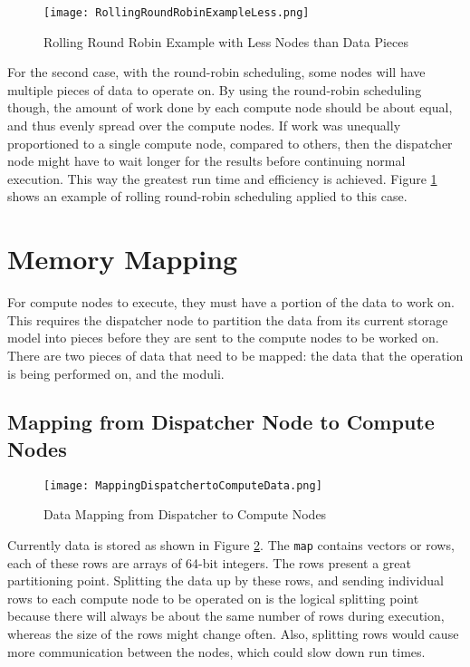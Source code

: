 \begin{figure}[t!]
\centering
\texttt{[image: RollingRoundRobinExampleLess.png]}
\caption{Rolling Round Robin Example with Less Nodes than Data Pieces}
\label{fig:RollingRoundRobinExampleLess}
\end{figure}
For the second case, with the round-robin scheduling, some nodes will have multiple pieces of data to operate on. By using the round-robin scheduling though, the amount of work done by each compute node should be about equal, and thus evenly spread over the compute nodes. If work was unequally proportioned to a single compute node, compared to others, then the dispatcher node might have to wait longer for the results before continuing normal execution. This way the greatest run time and efficiency is achieved. Figure \ref{fig:RollingRoundRobinExampleLess} shows an example of rolling round-robin scheduling applied to this case.

\section{Memory Mapping} \label{sec:DistributedMemoryMapping}
For compute nodes to execute, they must have a portion of the data to work on. This requires the dispatcher node to partition the data from its current storage model into pieces before they are sent to the compute nodes to be worked on. There are two pieces of data that need to be mapped: the data that the operation is being performed on, and the moduli.

\subsection{Mapping from Dispatcher Node to Compute Nodes}
\begin{figure}[t!]
\centering
\texttt{[image: MappingDispatchertoComputeData.png]}
\caption{Data Mapping from Dispatcher to Compute Nodes}
\label{fig:MappingDispatcherToComputeData}
\end{figure}
Currently data is stored as shown in Figure \ref{fig:MappingDispatcherToComputeData}. The \verb|map| contains vectors or rows, each of these rows are arrays of 64-bit integers. The rows present a great partitioning point. Splitting the data up by these rows, and sending individual rows to each compute node to be operated on is the logical splitting point because there will always be about the same number of rows during execution, whereas the size of the rows might change often. Also, splitting rows would cause more communication between the nodes, which could slow down run times. 

